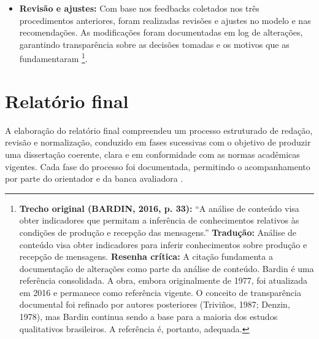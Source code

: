 \begin{itemize}
    \item \textbf{Revisão e ajustes:} Com base nos feedbacks coletados nos três procedimentos anteriores, foram realizadas revisões e ajustes no modelo e nas recomendações. As modificações foram documentadas em log de alterações, garantindo transparência sobre as decisões tomadas e os motivos que as fundamentaram \cite{BARDIN2016}\footnote{\textbf{Trecho original (BARDIN, 2016, p. 33):} ``A análise de conteúdo visa obter indicadores que permitam a inferência de conhecimentos relativos às condições de produção e recepção das mensagens.'' \textbf{Tradução:} Análise de conteúdo visa obter indicadores para inferir conhecimentos sobre produção e recepção de mensagens. \textbf{Resenha crítica:} A citação fundamenta a documentação de alterações como parte da análise de conteúdo. Bardin é uma referência consolidada. A obra, embora originalmente de 1977, foi atualizada em 2016 e permanece como referência vigente. O conceito de transparência documental foi refinado por autores posteriores (Triviños, 1987; Denzin, 1978), mas Bardin continua sendo a base para a maioria dos estudos qualitativos brasileiros. A referência é, portanto, adequada.}.
\end{itemize}

\section{Relatório final}
\label{sec:relatorio_final}

A elaboração do relatório final compreendeu um processo estruturado de redação, revisão e normalização, conduzido em fases sucessivas com o objetivo de produzir uma dissertação coerente, clara e em conformidade com as normas acadêmicas vigentes. Cada fase do processo foi documentada, permitindo o acompanhamento por parte do orientador e da banca avaliadora \cite{CRESWELL2018}.

